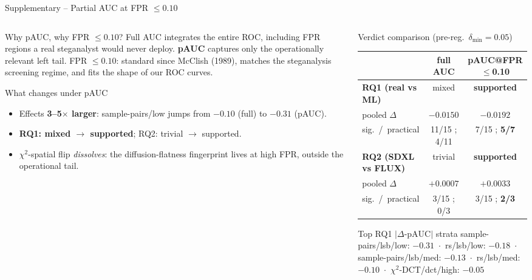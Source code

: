 \documentclass[aspectratio=169,11pt]{beamer}
\begin{document}
\begin{frame}{Supplementary -- Partial AUC at FPR $\leq 0.10$}
\scriptsize
\begin{columns}[T]
\begin{column}{0.42\textwidth}
\begin{block}{Why pAUC, why FPR $\leq 0.10$?}
Full AUC integrates the entire ROC, including FPR regions a real steganalyst would never deploy. \textbf{pAUC} captures only the operationally relevant left tail. FPR $\leq 0.10$: standard since McClish (1989), matches the steganalysis screening regime, and fits the shape of our ROC curves.
\end{block}
\begin{exampleblock}{What changes under pAUC}
\begin{itemize}\setlength{\itemsep}{1pt}
\item Effects \textbf{3--5$\times$ larger}: sample-pairs/low jumps from $-0.10$ (full) to $\boldsymbol{-0.31}$ (pAUC).
\item \textbf{RQ1: mixed $\to$ supported}; RQ2: trivial $\to$ supported.
\item $\chi^2$-spatial flip \emph{dissolves}: the diffusion-flatness fingerprint lives at high FPR, outside the operational tail.
\end{itemize}
\end{exampleblock}
\end{column}
\begin{column}{0.54\textwidth}
\begin{block}{Verdict comparison (pre-reg.\ $\delta_\text{min}\!=\!0.05$)}
\centering\renewcommand{\arraystretch}{1.0}
\begin{tabular}{l@{\hskip 6pt}c@{\hskip 6pt}c}
& \textbf{full AUC} & \textbf{pAUC@FPR$\leq$0.10} \\
\midrule
\textbf{RQ1 (real vs ML)}   & mixed  & \textbf{supported} \\
\quad pooled $\Delta$    & $-0.0150$ & $-0.0192$ \\
\quad sig.~/~practical   & 11/15 ; 4/11 & 7/15 ; \textbf{5/7} \\
\midrule
\textbf{RQ2 (SDXL vs FLUX)} & trivial & \textbf{supported} \\
\quad pooled $\Delta$    & $+0.0007$ & $+0.0033$ \\
\quad sig.~/~practical   & 3/15 ; 0/3 & 3/15 ; \textbf{2/3} \\
\end{tabular}
\end{block}
\begin{block}{Top RQ1 $|\Delta\text{-pAUC}|$ strata}
\scriptsize sample-pairs/lsb/low: $\boldsymbol{-0.31}$ \,$\cdot$\, rs/lsb/low: $-0.18$ \,$\cdot$\, sample-pairs/lsb/med: $-0.13$ \,$\cdot$\, rs/lsb/med: $-0.10$ \,$\cdot$\, $\chi^2$-DCT/dct/high: $-0.05$
\end{block}
\end{column}
\end{columns}
\end{frame}
\end{document}
